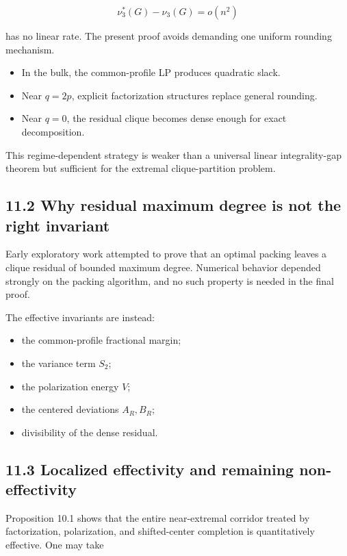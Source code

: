 \documentclass[
  11pt,
]{article}
\providecommand{\tightlist}{%
  \setlength{\itemsep}{0pt}\setlength{\parskip}{0pt}}
\begin{document}
\[
\nu_3^*(G)-\nu_3(G)=o(n^2)
\]

has no linear rate. The present proof avoids demanding one uniform
rounding mechanism.

\begin{itemize}
\tightlist
\item
  In the bulk, the common-profile LP produces quadratic slack.
\item
  Near \(q=2p\), explicit factorization structures replace general
  rounding.
\item
  Near \(q=0\), the residual clique becomes dense enough for exact
  decomposition.
\end{itemize}

This regime-dependent strategy is weaker than a universal linear
integrality-gap theorem but sufficient for the extremal clique-partition
problem.

\subsection{11.2 Why residual maximum degree is not the right
invariant}\label{why-residual-maximum-degree-is-not-the-right-invariant}

Early exploratory work attempted to prove that an optimal packing leaves
a clique residual of bounded maximum degree. Numerical behavior depended
strongly on the packing algorithm, and no such property is needed in the
final proof.

The effective invariants are instead:

\begin{itemize}
\tightlist
\item
  the common-profile fractional margin;
\item
  the variance term \(S_2\);
\item
  the polarization energy \(V\);
\item
  the centered deviations \(A_R,B_R\);
\item
  divisibility of the dense residual.
\end{itemize}

\subsection{11.3 Localized effectivity and remaining
non-effectivity}\label{localized-effectivity-and-remaining-non-effectivity}

Proposition 10.1 shows that the entire near-extremal corridor treated by
factorization, polarization, and shifted-center completion is
quantitatively effective. One may take
\end{document}
